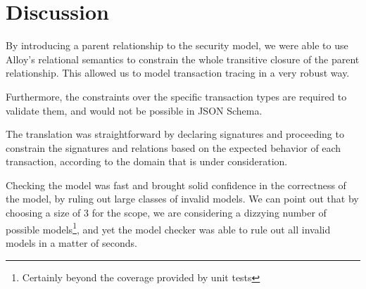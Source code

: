 \section{Discussion}

By introducing a parent relationship to the security model, we were able to use Alloy's relational semantics to constrain the whole transitive closure of the parent relationship. This allowed us to model transaction tracing in a very robust way.

Furthermore, the constraints over the specific transaction types are required to validate them, and would not be possible in JSON Schema.

The translation was straightforward by declaring signatures and proceeding to constrain the signatures and relations based on the expected behavior of each transaction, according to the domain that is under consideration.

Checking the model was fast and brought solid confidence in the correctness of the model, by ruling out large classes of invalid models. We can point out that by choosing a size of 3 for the scope, we are considering a dizzying number of possible models\footnote{Certainly beyond the coverage provided by unit tests}, and yet the model checker was able to rule out all invalid models in a matter of seconds.

